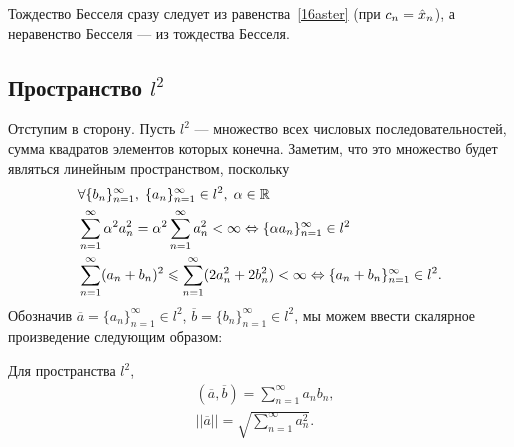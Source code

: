 Тождество Бесселя сразу следует из равенства~\eqref{16aster} (при $c_n = \hat{x}_n$), а неравенство Бесселя --- из тождества Бесселя.
\subsection{Пространство $l^2$}
Отступим в сторону.
Пусть $l^2$ --- множество всех числовых последовательностей, сумма квадратов элементов которых конечна. Заметим, что это множество будет являться линейным пространством, поскольку
\begin{align*}
    &\forall \{b_n\}_{n=1}^{\infty},\; \{a_n\}_{n=1}^{\infty} \in l^2,\; \alpha \in \mathbb{R}\\
    &\sum\limits_{n=1}^{\infty} \alpha^2 a_n^2 = \alpha^2 \sum\limits_{n=1}^{\infty} a_n^2 < \infty \Leftrightarrow \{\alpha a_n\}_{n=1}^{\infty} \in l^2\\
    &\sum\limits_{n=1}^{\infty} (a_n+b_n)^2 \leqslant \sum\limits_{n=1}^{\infty} (2a_n^2 + 2b_n^2) < \infty \Leftrightarrow \{a_n + b_n\}_{n=1}^{\infty} \in l^2.
\end{align*}
Обозначив $\overline{a} = \{a_n\}_{n=1}^{\infty}\in l^2$, $\overline{b} = \{b_n\}_{n=1}^{\infty} \in l^2$, мы можем ввести скалярное произведение следующим образом:
\begin{Def}
    Для пространства $l^2$, 
    \begin{align*}
        &(\overline{a}, \overline{b}) = \sum\limits_{n=1}^{\infty} a_nb_n,\\
        &||\overline{a}|| = \sqrt{\sum\limits_{n=1}^{\infty}a_n^2}.
    \end{align*}
\end{Def}
